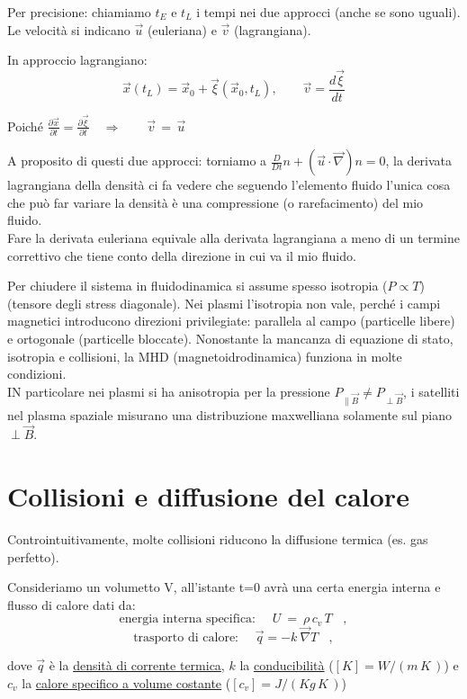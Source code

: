 Per precisione: chiamiamo $t_E$ e $t_L$ i tempi nei due approcci (anche se sono uguali). Le velocità si indicano $\vec u$ (euleriana) e $\vec v$ (lagrangiana).  

In approccio lagrangiano:
\[
\vec x(t_L) = \vec x_0 + \vec \xi(\vec x_0,t_L), 
\qquad 
\vec v = \frac{d\vec \xi}{dt}
\]
\medskip

Poiché  $\displaystyle\frac{\partial \vec x}{\partial t} = \frac{\partial \vec \xi}{\partial t} \quad \Rightarrow \qquad \vec v\, =\, \vec u$

\medskip
A proposito di questi due approcci: torniamo a $\frac{D}{Dt}n+ (\vec u\cdot\vec \nabla)n=0$, la derivata lagrangiana della densità ci fa vedere che seguendo l'elemento fluido l'unica cosa che può far variare la densità è una compressione (o rarefacimento) del mio fluido. \\Fare la derivata euleriana equivale alla derivata lagrangiana a meno di un termine correttivo che tiene conto della direzione in cui va il mio fluido. 
\medskip

Per chiudere il sistema in fluidodinamica si assume spesso isotropia ($P\propto T$)  (tensore degli stress diagonale). Nei plasmi l'isotropia non vale, perché i campi magnetici introducono direzioni privilegiate: parallela al campo (particelle libere) e ortogonale (particelle bloccate). Nonostante la mancanza di equazione di stato, isotropia e collisioni, la MHD (magnetoidrodinamica) funziona in molte condizioni.
\\IN particolare nei plasmi si ha anisotropia per la pressione $P_{\parallel\vec B}\neq P_{\perp\vec B}$, i satelliti nel plasma spaziale misurano una distribuzione maxwelliana solamente sul piano $\perp \vec B$.


\section{Collisioni e diffusione del calore}

Controintuitivamente, molte collisioni riducono la diffusione termica (es. gas perfetto). 

Consideriamo un volumetto V, all'istante t=0 avrà una certa energia interna e flusso di calore dati da:
\[ \text{energia interna specifica: }\quad U\ =\ \rho\, c_v\, T \ \ \ \ ,\]
\[ \text{trasporto di calore: }\quad \vec{q} = -k \ \vec\nabla T\ \ \ \ ,\]

dove $\vec{q}$ è la \underline{densità di corrente termica}, $k$ la \underline{conducibilità} ($[K]=W/(m\,K\,)$) e $c_v$ la \underline{calore specifico a volume costante} ($[c_v]=J/(Kg\,K\,)$)

